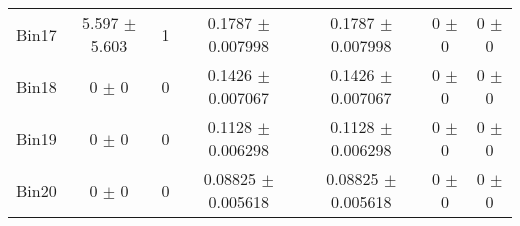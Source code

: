 \begin{tabular}{@{\extracolsep{4pt}}lcccccc@{}}
     Bin17 & 5.597 $\pm$ 5.603 & 1 & 0.1787 $\pm$ 0.007998 & 0.1787 $\pm$ 0.007998 & 0 $\pm$ 0 & 0 $\pm$ 0 \\ 
     Bin18 & 0 $\pm$ 0 & 0 & 0.1426 $\pm$ 0.007067 & 0.1426 $\pm$ 0.007067 & 0 $\pm$ 0 & 0 $\pm$ 0 \\ 
     Bin19 & 0 $\pm$ 0 & 0 & 0.1128 $\pm$ 0.006298 & 0.1128 $\pm$ 0.006298 & 0 $\pm$ 0 & 0 $\pm$ 0 \\ 
     Bin20 & 0 $\pm$ 0 & 0 & 0.08825 $\pm$ 0.005618 & 0.08825 $\pm$ 0.005618 & 0 $\pm$ 0 & 0 $\pm$ 0 \\ 
\hline\hline
  \end{tabular}
